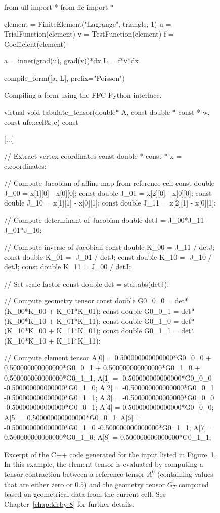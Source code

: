 \begin{figure}
  \begin{python}
from ufl import *
from ffc import *

element = FiniteElement("Lagrange", triangle, 1)
u = TrialFunction(element)
v = TestFunction(element)
f = Coefficient(element)

a = inner(grad(u), grad(v))*dx
L = f*v*dx

compile_form([a, L], prefix="Poisson")
  \end{python}
  \caption{Compiling a form using the FFC Python interface.}
  \label{fig:logg-1:python:form}
\end{figure}

\begin{figure}
  \begin{c++}
virtual void tabulate_tensor(double* A,
                             const double * const * w,
                             const ufc::cell& c) const
{
  [...]

  // Extract vertex coordinates
  const double * const * x = c.coordinates;

  // Compute Jacobian of affine map from reference cell
  const double J_00 = x[1][0] - x[0][0];
  const double J_01 = x[2][0] - x[0][0];
  const double J_10 = x[1][1] - x[0][1];
  const double J_11 = x[2][1] - x[0][1];

  // Compute determinant of Jacobian
  double detJ = J_00*J_11 - J_01*J_10;

  // Compute inverse of Jacobian
  const double K_00 =  J_11 / detJ;
  const double K_01 = -J_01 / detJ;
  const double K_10 = -J_10 / detJ;
  const double K_11 =  J_00 / detJ;

  // Set scale factor
  const double det = std::abs(detJ);

  // Compute geometry tensor
  const double G0_0_0 = det*(K_00*K_00 + K_01*K_01);
  const double G0_0_1 = det*(K_00*K_10 + K_01*K_11);
  const double G0_1_0 = det*(K_10*K_00 + K_11*K_01);
  const double G0_1_1 = det*(K_10*K_10 + K_11*K_11);

  // Compute element tensor
  A[0] = 0.500000000000000*G0_0_0
       + 0.500000000000000*G0_0_1
       + 0.500000000000000*G0_1_0
       + 0.500000000000000*G0_1_1;
  A[1] = -0.500000000000000*G0_0_0
         -0.500000000000000*G0_1_0;
  A[2] = -0.500000000000000*G0_0_1
         -0.500000000000000*G0_1_1;
  A[3] = -0.500000000000000*G0_0_0
         -0.500000000000000*G0_0_1;
  A[4] = 0.500000000000000*G0_0_0;
  A[5] = 0.500000000000000*G0_0_1;
  A[6] = -0.500000000000000*G0_1_0
         -0.500000000000000*G0_1_1;
  A[7] = 0.500000000000000*G0_1_0;
  A[8] = 0.500000000000000*G0_1_1;
}
  \end{c++}
  \caption{Excerpt of the C++ code generated for the input listed in
  Figure~\ref{fig:logg-1:python:form}. In this example, the element tensor is
  evaluated by computing a tensor contraction between a reference
  tensor $A^0$ (containing values that are either zero or $0.5$) and
  the geometry tensor $G_T$ computed based on geometrical data from
  the current cell. See Chapter~\ref{chap:kirby-8} for further details.}
  \label{fig:logg-1:formcode}
\end{figure}

